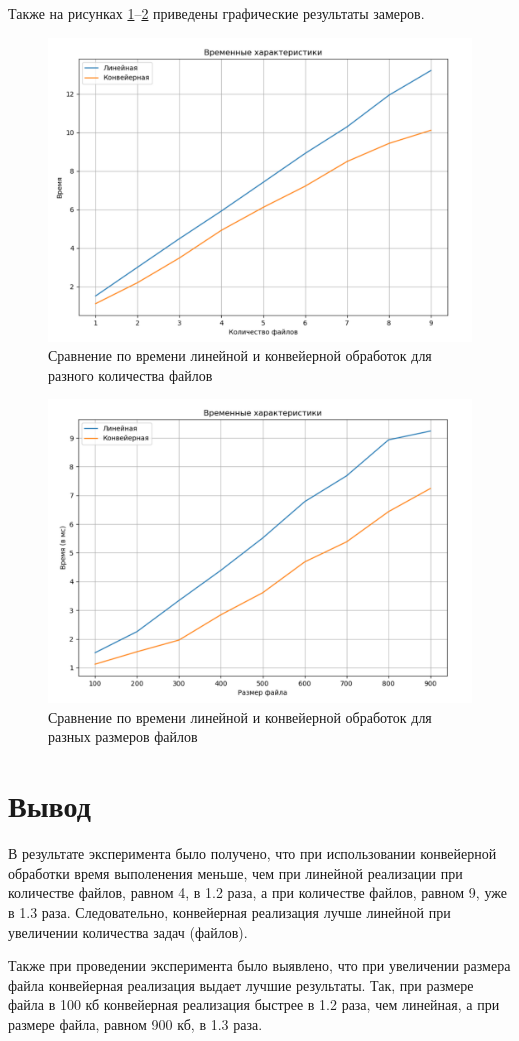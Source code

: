 \clearpage

Также на рисунках \ref{fig:graph_count}--\ref{fig:graph_size} приведены графические результаты замеров.

\begin{figure}[h!]
	\centering
	\includegraphics[width=0.8\linewidth]{img/graph_count}
	\caption{Сравнение по времени линейной и конвейерной обработок для разного количества файлов}
	\label{fig:graph_count}
\end{figure}

\begin{figure}[h!]
	\centering
	\includegraphics[width=0.8\linewidth]{img/graph_size}
	\caption{Сравнение по времени линейной и конвейерной обработок для разных размеров файлов}
	\label{fig:graph_size}
\end{figure}

\clearpage


\section{Вывод}

В результате эксперимента было получено, что при использовании конвейерной обработки время выполенения меньше, чем при линейной реализации при количестве файлов, равном 4, в 1.2 раза, а при количестве файлов, равном 9, уже в 1.3 раза. 
Следовательно, конвейерная реализация лучше линейной при увеличении количества задач (файлов).

Также при проведении эксперимента было выявлено, что при увеличении размера файла конвейерная реализация выдает лучшие результаты. 
Так, при размере файла в 100 кб конвейерная реализация быстрее в 1.2 раза, чем линейная, а при размере файла, равном 900 кб, в 1.3 раза. 